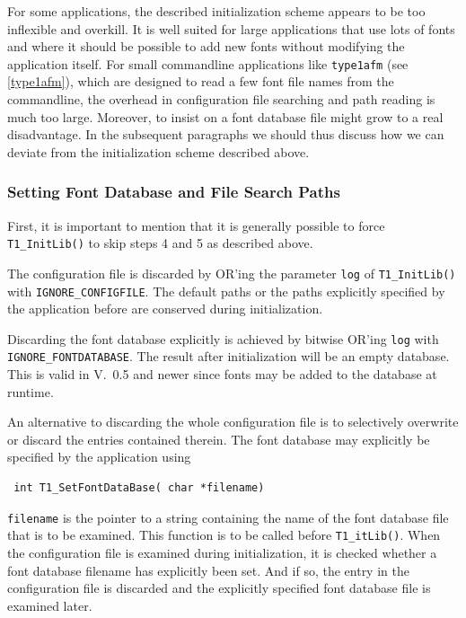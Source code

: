 For some applications, the described initialization scheme appears to be too
inflexible and overkill. It is well suited for large applications that use
lots of fonts and where it should be possible to add new fonts without
modifying the application itself. For small commandline applications like
\verb+type1afm+ (see \ref{type1afm}), which are designed to read a few font file
names from the commandline, the overhead in configuration file searching and
path reading is much too large. Moreover, to insist on a font database file
might grow to a real disadvantage. In the subsequent paragraphs we should thus
discuss how we can deviate from the initialization scheme described above.

\subsubsection{Setting Font Database and File Search Paths}
\label{manipulatingpaths}%
First, it is important to mention that it is generally possible to force
\verb+T1_InitLib()+ to skip steps 4 and 5 as described above. 

The configuration file is discarded by OR'ing the parameter \verb+log+ of
\verb+T1_InitLib()+ with \verb+IGNORE_CONFIGFILE+. The default paths or the
paths explicitly specified by the application before are conserved during
initialization. 

Discarding the font database explicitly is achieved by bitwise OR'ing
\verb+log+ with \\ 
\verb+IGNORE_FONTDATABASE+. The result after initialization
will be an empty database. This is valid in V.\ 0.5 and newer since fonts may
be added to the database at runtime. 

An alternative to discarding the whole configuration file is to selectively
overwrite or discard the entries contained therein. The font database may
explicitly be specified by the application using 
\precorr
\begin{verbatim}
 int T1_SetFontDataBase( char *filename)
\end{verbatim}\postcorr
\verb+filename+ is the pointer to a string containing the name of the font
database file that is to be examined. This function is to be called before
\verb+T1_itLib()+. When the configuration file is examined during
initialization, it is checked whether a font database filename has explicitly
been set. And if so, the entry in the configuration file is discarded and the
explicitly specified font database file is examined later.

